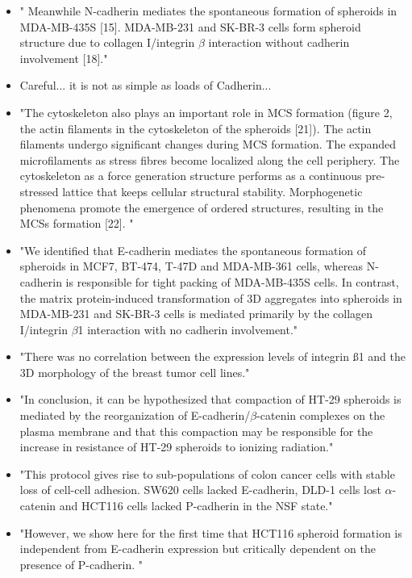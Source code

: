 \documentclass[11pt,a4paper]{article}
\begin{document}
\begin{itemize}
\item " Meanwhile N-cadherin mediates the spontaneous formation of spheroids in MDA-MB-435S [15]. MDA-MB-231 and SK-BR-3 cells form spheroid structure due to collagen I/integrin $\beta$ interaction without cadherin involvement [18]."\cite{Cui2017}

\item Careful... it is not as simple as loads of Cadherin...

\item "The cytoskeleton also plays an important role in MCS formation (figure 2, the actin filaments in the cytoskeleton of the spheroids [21]). The actin filaments undergo significant changes during MCS formation. The expanded microfilaments as stress fibres become localized along the cell periphery. The cytoskeleton as a force generation structure performs as a continuous pre-stressed lattice that keeps cellular structural stability. Morphogenetic phenomena promote the emergence of ordered structures, resulting in the MCSs formation [22]. "\cite{Cui2017}

\item "We identified that E-cadherin mediates the spontaneous formation of spheroids in MCF7, BT-474, T-47D and MDA-MB-361 cells, whereas N-cadherin is responsible for tight packing of MDA-MB-435S cells. In contrast, the matrix protein-induced transformation of 3D aggregates into spheroids in MDA-MB-231 and SK-BR-3 cells is mediated primarily by the collagen I/integrin $\beta$1 interaction with no cadherin involvement."\cite{Ivascu2008}

\item "There was no correlation between the expression levels of integrin ß1 and the 3D morphology of the breast tumor cell lines."\cite{Ivascu2008}

\item "In conclusion, it can be hypothesized that compaction of HT-29 spheroids is mediated by the reorganization of E-cadherin/$\beta$-catenin complexes on the plasma membrane and that this compaction may be responsible for the increase in resistance of HT-29 spheroids to ionizing radiation."\cite{Ferrante2006}

\item "This protocol gives rise to sub-populations of colon cancer cells with stable loss of cell-cell adhesion. SW620 cells lacked E-cadherin, DLD-1 cells lost $\alpha$-catenin and HCT116 cells lacked P-cadherin in the NSF state."\cite{Stadler2018}

\item "However, we show here for the first time that HCT116 spheroid formation is independent from E-cadherin expression but critically dependent on the presence of P-cadherin. "\cite{Stadler2018}


\end{itemize}
\end{document}
